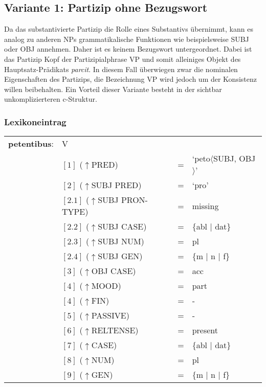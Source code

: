 \documentclass[12pt,a4paper]{article}
\begin{document}
\subsection{Variante 1: Partizip ohne Bezugswort}
Da das substantivierte Partizip die Rolle eines Substantivs übernimmt, kann es analog zu anderen NPs grammatikalische Funktionen wie beispielsweise SUBJ oder OBJ annehmen. Daher ist es keinem Bezugswort untergeordnet. Dabei ist das Partizip Kopf der Partizipialphrase VP und somit alleiniges Objekt des Hauptsatz-Prädikats \textit{parcit}. In diesem Fall überwiegen zwar die nominalen Eigenschaften des Partizips, die Bezeichnung VP wird jedoch um der Konsistenz willen beibehalten. Ein Vorteil dieser Variante besteht in der sichtbar unkomplizierteren c-Struktur.

\subsubsection{Lexikoneintrag}
\begin{singlespace}
\begin{tabular}{ l  l  l  l  } 
\textbf{petentibus}: & V \\
$\qquad$ & $[1]$ \:  ($\uparrow$PRED) & = & `peto$\langle$SUBJ, OBJ$\rangle$' \\
$\qquad$ & $[2]$ \:  ($\uparrow$SUBJ PRED) & = & `pro' \\
$\qquad$ & $[2.1]$ \:  ($\uparrow$SUBJ PRON-TYPE) & = & missing \\
$\qquad$ & $[2.2]$ \:  ($\uparrow$SUBJ CASE) & = & \{abl $\mid$ dat\} \\
$\qquad$ & $[2.3]$ \:  ($\uparrow$SUBJ NUM) & = & pl \\
$\qquad$ & $[2.4]$ \:  ($\uparrow$SUBJ GEN) & = & \{m $\mid$ n $\mid$ f\} \\
$\qquad$ & $[3]$ \:  ($\uparrow$OBJ CASE) & = & acc \\
$\qquad$ & $[4]$ \:  ($\uparrow$MOOD) & = & part\\
$\qquad$ & $[4]$ \:  ($\uparrow$FIN) & = & - \\
$\qquad$ & $[5]$ \:  ($\uparrow$PASSIVE) & = & - \\
$\qquad$ & $[6]$ \:  ($\uparrow$RELTENSE) & = & present \\ 
$\qquad$ & $[7]$ \:  ($\uparrow$CASE) & = & \{abl $\mid$ dat\} \\
$\qquad$ & $[8]$ \:  ($\uparrow$NUM) & = & pl \\
$\qquad$ & $[9]$ \:  ($\uparrow$GEN) & = & \{m $\mid$ n $\mid$ f\} \\
\end{tabular}
\newline
\end{singlespace}
\end{document}
